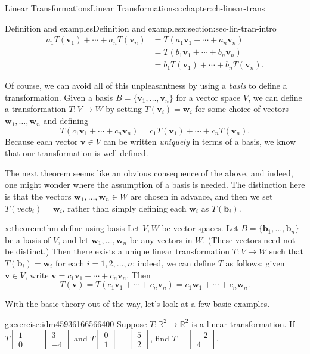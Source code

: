 \documentclass[oneside,10pt,]{book}
\numberwithin{equation}{section}
\newcommand{\bbm}{\begin{bmatrix}}
\newcommand{\ebm}{\end{bmatrix}}
\newcommand{\R}{\mathbb{R}}
\newcommand{\vv}{\mathbf{v}}
\newcommand{\ww}{\mathbf{w}}
\newcommand{\amp}{&}
\begin{document}
\begin{chapterptx}{Linear Transformations}{}{Linear Transformations}{}{}{x:chapter:ch-linear-trans}
\begin{sectionptx}{Definition and examples}{}{Definition and examples}{}{}{x:section:sec-lin-tran-intro}
\begin{align*}
a_1T(\vv_1)+\cdots + a_nT(\vv_n) \amp =T(a_1\vv_1+\cdots + a_n\vv_n) \\
\amp =T(b_1\vv_1+\cdots +b_n\vv_n)\\
\amp =b_1T(\vv_1)+\cdots +b_nT(\vv_n)\text{.}
\end{align*}
%
\par
Of course, we can avoid all of this unpleasantness by using a \emph{basis} to define a transformation. Given a basis \(B = \{\vv_1,\ldots, \vv_n\}\) for a vector space \(V\), we can define a transformation \(T:V\to W\) by setting \(T(\vv_i)=\ww_i\) for some choice of vectors \(\ww_1,\ldots, \ww_n\) and defining%
\begin{equation*}
T(c_1\vv_1+\cdots +c_n\vv_n)=c_1T(\vv_1)+\cdots + c_nT(\vv_n)\text{.}
\end{equation*}
Because each vector \(\vv\in V\) can be written \emph{uniquely} in terms of a basis, we know that our transformation is well-defined.%
\par
The next theorem seems like an obvious consequence of the above, and indeed, one might wonder where the assumption of a basis is needed. The distinction here is that the vectors \(\ww_1,\ldots, \ww_n\in W\) are chosen in advance, and then we set \(T(vec{b}_i)=\ww_i\), rather than simply defining each \(\ww_i\) as \(T(\mathbf{b}_i)\).%
\begin{theorem}{}{}{x:theorem:thm-define-using-basis}%
Let \(V,W\) be vector spaces. Let \(B=\{\mathbf{b}_1,\ldots, \mathbf{b}_n\}\) be a basis of \(V\), and let \(\ww_1,\ldots, \ww_n\) be any vectors in \(W\). (These vectors need not be distinct.) Then there exists a unique linear transformation \(T:V\to W\) such that \(T(\mathbf{b}_i)=\ww_i\) for each \(i=1,2,\ldots, n\); indeed, we can define \(T\) as follows: given \(\vv\in V\), write \(\vv=c_1\vv_1+\cdots +c_n\vv_n\). Then%
\begin{equation*}
T(\vv)=T(c_1\vv_1+\cdots + c_n\vv_n) = c_1\ww_1+\cdots +c_n\ww_n\text{.}
\end{equation*}
%
\end{theorem}
With the basic theory out of the way, let's look at a few basic examples.%
\begin{inlineexercise}{}{g:exercise:idm45936166566400}%
Suppose \(T:\R^2\to \R^2\) is a linear transformation. If \(T\bbm 1\\0\ebm = \bbm 3\\-4\ebm\) and \(T\bbm 0\\1\ebm =\bbm 5\\2\ebm\), find \(T=\bbm -2\\4\ebm\).%

\end{inlineexercise}
\end{sectionptx}
\end{chapterptx}
\end{document}
